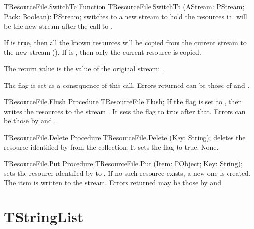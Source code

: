 \begin{function}{TResourceFile.SwitchTo}
\Declaration
Function TResourceFile.SwitchTo (AStream: PStream; Pack: Boolean): PStream;
\Description
{} switches to a new stream to hold the resources in.
 will be the new stream after the call to .

If  is true, then all the known resources will be copied from 
the current stream to the new stream (). If  is 
, then only the current resource is copied.

The return value is the value of the original stream: .

The  flag is set as a consequence of this call.
\Errors
Errors returned can be those of  and
.
\SeeAlso
{}
\end{function}

\begin{procedure}{TResourceFile.Flush}
\Declaration
Procedure TResourceFile.Flush;
\Description
If the  flag is set to , then  
writes the resources to the stream . It sets the 
flag to true after that.
\Errors
Errors can be those by  and .
\SeeAlso
{}
\end{procedure}

\begin{procedure}{TResourceFile.Delete}
\Declaration
Procedure TResourceFile.Delete (Key: String);
\Description
{} deletes the resource identified by  from the
collection. It sets the  flag to true.
\Errors
None.
\SeeAlso
{}
\end{procedure}

\begin{procedure}{TResourceFile.Put}
\Declaration
Procedure TResourceFile.Put (Item: PObject; Key: String);
\Description
{} sets the resource identified by  to .
If no such resource exists, a new one is created. The item is written
to the stream.
\Errors
Errors returned may be those by  and 
\SeeAlso
{}
\end{procedure}


\section{TStringList}
\label{se:TStringList}

